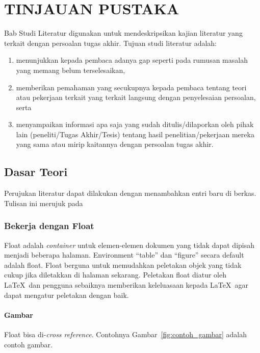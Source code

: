 \chapter{TINJAUAN PUSTAKA}

Bab Studi Literatur digunakan untuk mendeskripsikan kajian literatur yang terkait dengan persoalan tugas akhir. Tujuan studi literatur adalah:

\begin{enumerate}
    \item menunjukkan kepada pembaca adanya gap seperti pada rumusan masalah yang memang belum terselesaikan,
    \item memberikan pemahaman yang secukupnya kepada pembaca tentang teori atau pekerjaan terkait yang terkait langsung dengan penyelesaian persoalan, serta
    \item menyampaikan informasi apa saja yang sudah ditulis/dilaporkan oleh pihak lain (peneliti/Tugas Akhir/Tesis) tentang hasil penelitian/pekerjaan mereka yang sama atau mirip kaitannya dengan persoalan tugas akhir.
\end{enumerate}

\section{Dasar Teori}
Perujukan literatur dapat dilakukan dengan menambahkan entri baru di berkas. Tulisan ini merujuk pada \parencite{knuth2001art}

    \subsection{Bekerja dengan Float}

    Float adalah \textit{container} untuk elemen-elemen dokumen yang tidak dapat dipisah menjadi beberapa halaman. Environment ``table'' dan ``figure'' secara default adalah float. Float berguna untuk memudahkan peletakan objek yang tidak cukup jika diletakkan di halaman sekarang. Peletakan float diatur oleh \LaTeX\ dan pengguna sebaiknya memberikan keleluasaan kepada \LaTeX\ agar dapat mengatur peletakan dengan baik. 
    
    \subsubsection{Gambar}
    
    Float bisa di-\textit{cross reference}. Contohnya Gambar~\ref{fig:contoh_gambar} adalah contoh gambar.

